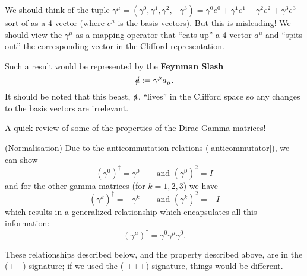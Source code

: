 We should think of the tuple $\gamma^{\mu} = \left(\gamma^0, \gamma^1, \gamma^2, -\gamma^3 \right) = \gamma^{0}e^0 + \gamma^1e^1 + \gamma^2e^2 + \gamma^3e^3$ sort of as a 4-vector (where $e^\mu$ is the basis vectors). But this is misleading! We should view the $\gamma^\mu$ as a mapping operator that ``eats up'' a 4-vector $a^\mu$ and ``spits out'' the corresponding vector in the Clifford representation.

Such a result would be represented by the \textbf{Feynman Slash}
\begin{equation}
\slashchar{a} := \gamma^\mu a_\mu. 
\end{equation}
It should be noted that this beast, $\slashchar{a}$, ``lives'' in the Clifford space so any changes to the basis vectors are irrelevant.

A quick review of some of the properties of the Dirac Gamma matrices!

\begin{property}{(Normalisation)}
Due to the anticommutation relations (\ref{anticommutator}), we can show
\begin{equation}
\left(\gamma^0\right)^\dag = \gamma^0\qquad\textrm{and }\left(\gamma^0\right)^2 = I
\end{equation}
and for the other gamma matrices (for $k=1,2,3$) we have
\begin{equation}
\left(\gamma^k\right)^\dag = -\gamma^k\qquad\textrm{and }\left(\gamma^k\right)^2 = -I
\end{equation}
which results in a generalized relationship which encapsulates all this information:
\begin{equation}
\left( \gamma^\mu \right)^\dagger = \gamma^0 \gamma^\mu \gamma^0.
\end{equation}
\end{property}

\begin{rmk}
These relationships described below, and the property described above, are in the (+---) signature; if we used the (-+++) signature, things would be different.
\end{rmk}

